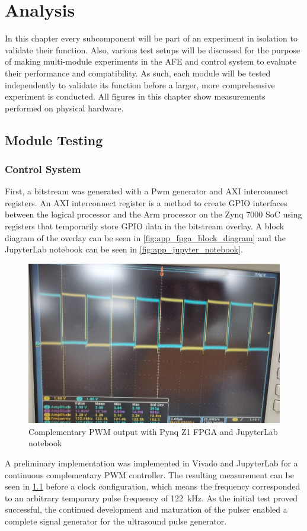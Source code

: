 \chapter{Analysis}
In this chapter every subcomponent will be part of an experiment in isolation to validate their function. Also, various test setups will be discussed for the purpose of making multi-module experiments in the AFE and control system to evaluate their performance and compatibility. As such, each module will be tested independently to validate its function before a larger, more comprehensive experiment is conducted. All figures in this chapter show measurements performed on physical hardware.

\section{Module Testing}
\subsection{Control System}
First, a bitstream was generated with a Pwm generator and AXI interconnect registers. An AXI interconnect register is a method to create GPIO interfaces between the logical processor and the Arm processor on the Zynq 7000 SoC using registers that temporarily store GPIO data in the bitstream overlay. A block diagram of the overlay can be seen in \cref{fig:app_fpga_block_diagram} and the JupyterLab notebook can be seen in \cref{fig:app_jupyter_notebook}.

\begin{figure}[htbp]
	\centering
	\includegraphics[width=.8\textwidth]{Figures/4_controlsystem_fpga_pwm.png}
	\caption{Complementary PWM output with Pynq Z1 FPGA and JupyterLab notebook}
	\label{fig:4_controlsystem_fpga_pwm}
\end{figure}
A preliminary implementation was implemented in Vivado and JupyterLab for a continuous complementary PWM controller. The resulting measurement can be seen in \cref{fig:4_controlsystem_fpga_pwm} before a clock configuration, which means the frequency corresponded to an arbitrary temporary pulse frequency of \qty{122}{\kilo\hertz}. As the initial test proved successful, the continued development and maturation of the pulser enabled a complete signal generator for the ultrasound pulse generator.

